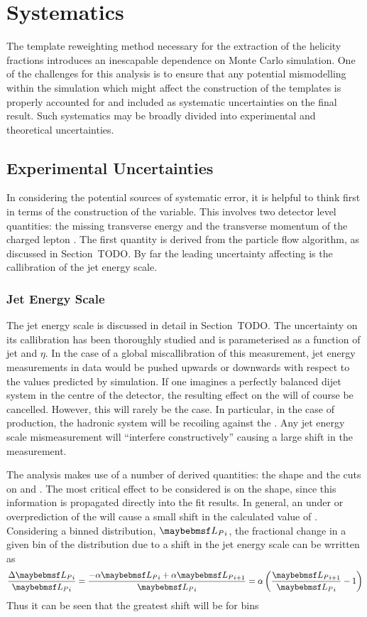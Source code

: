 \section{Systematics}
The template reweighting method necessary for the extraction of the helicity
fractions introduces an inescapable dependence on Monte Carlo simulation. One of
the challenges for this analysis is to ensure that any potential mismodelling
within the simulation which might affect the construction of the \LP templates
is properly accounted for and included as systematic uncertainties on the final
result. Such systematics may be broadly divided into experimental and
theoretical uncertainties.

\subsection{Experimental Uncertainties}
In considering the potential sources of systematic error, it is helpful to think
first in terms of the construction of the \LP variable. This involves two
detector level quantities: the missing transverse energy \MET and the transverse
momentum of the charged lepton \Ptl. The first quantity is derived from the
particle flow algorithm, as discussed in Section~TODO. By far the leading
uncertainty affecting is the callibration of the jet energy scale.

\subsubsection{Jet Energy Scale}
The jet energy scale is discussed in detail in Section~TODO. The uncertainty on
its callibration has been thoroughly studied and is parameterised as a function
of jet \Pt and $\eta$. In the case of a global miscallibration of this
measurement, jet energy measurements in data would be pushed upwards or
downwards with respect to the values predicted by simulation. If one imagines a
perfectly balanced dijet system in the centre of the detector, the resulting
effect on the \MET will of course be cancelled. However, this will rarely be the
case. In particular, in the case of \Wjets production, the hadronic system will
be recoiling against the \PW. Any jet energy scale mismeasurement will
``interfere constructively'' causing a large shift in the \MET measurement.

The analysis makes use of a number of \MET derived quantities: the \LP shape and
the cuts on \PtW and \MT. The most critical effect to be considered is on the
\LP shape, since this information is propagated directly into the fit
results. In general, an under or overprediction of the \MET will cause a small
shift in the calculated value of \LP. Considering a binned distribution, $\LP_i$,
the fractional change in a given bin of the distribution due to a shift in the
jet energy scale can be wrritten as
\begin{equation*}
\frac{\Delta\LP_i}{\LP_i} = \frac{-\alpha\LP_i + \alpha \LP_{i+1}}{\LP_i} = \alpha \left(\frac{\LP_{i+1}}{\LP_i} - 1\right)
\end{equation*}
Thus it can be seen that the greatest shift will be for bins


